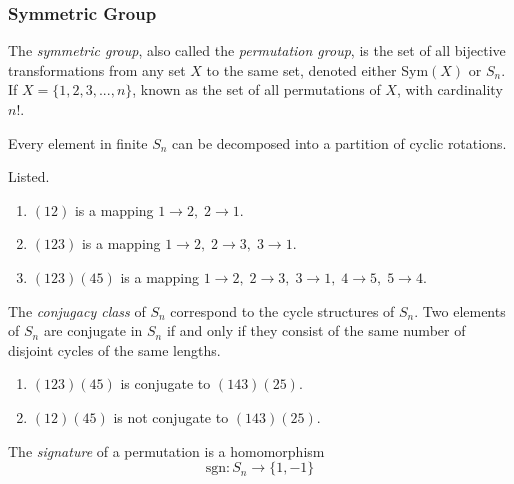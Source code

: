 \documentclass{article}
\begin{document}
\subsubsection{Symmetric Group}

\begin{definition}
  The \textit{symmetric group}, also called the \textit{permutation group}, is the set of all bijective transformations from any set $X$ to the same set, denoted either Sym$(X)$ or $S_n$. If $X = \{1, 2, 3 ,... , n\}$, known as the set of all permutations of $X$, with cardinality $n!$. 
\end{definition}

\begin{proposition}
  Every element in finite $S_{n}$ can be decomposed into a partition of cyclic rotations.
\end{proposition}

\begin{example}
  Listed.
  \begin{enumerate}
    \item $(1 2)$ is a mapping $1 \rightarrow 2,\; 2 \rightarrow 1$. 
    \item $(1 2 3)$ is a mapping $1\rightarrow 2,\; 2 \rightarrow 3,\; 3 \rightarrow 1$. 
    \item $(1 2 3) (4 5)$ is a mapping $1\rightarrow 2,\; 2 \rightarrow 3,\; 3 \rightarrow 1, \;4 \rightarrow 5, \;5 \rightarrow 4$. 
  \end{enumerate}
\end{example}

\begin{definition}
  The \textit{conjugacy class} of $S_{n}$ correspond to the cycle structures of $S_{n}$. Two elements of $S_{n}$ are conjugate in $S_{n}$ if and only if they consist of the same number of disjoint cycles of the same lengths. 
\end{definition}

\begin{example}
  \begin{enumerate}
    \item $(1 2 3) (4 5)$ is conjugate to $(1 4 3) (2 5)$.
    \item $(1 2) (4 5)$ is not conjugate to $(1 4 3) (2 5)$. 
  \end{enumerate}
\end{example}

\begin{definition}
  The \textit{signature} of a permutation is a homomorphism
  \begin{equation}
    \text{sgn}: S_{n} \longrightarrow \{1, -1\}
  \end{equation}
\end{definition}
\end{document}

